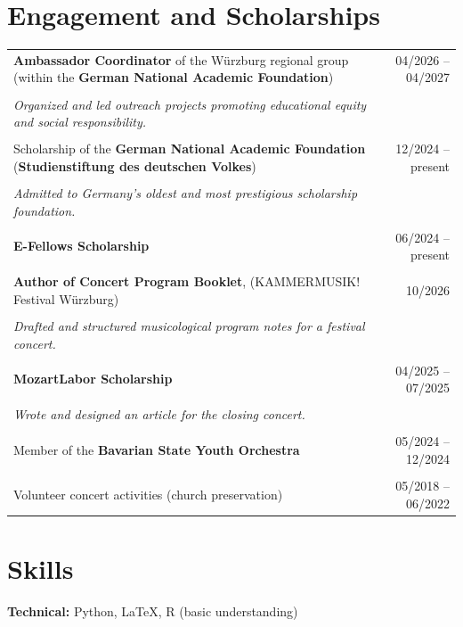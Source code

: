 \documentclass[11pt,a4paper]{article}
\begin{document}
\section{Engagement and Scholarships}

\begin{tabularx}{\textwidth}{X r}

\textbf{Ambassador Coordinator} of the Würzburg regional group (within the \textbf{German National Academic Foundation}) & 04/2026 -- 04/2027 \\\\
\textit{Organized and led outreach projects promoting educational equity and social responsibility.} \\\\
Scholarship of the \textbf{German National Academic Foundation} 
(\textbf{Studienstiftung des deutschen Volkes}) & 12/2024 -- present \\\\
\textit{Admitted to Germany's oldest and most prestigious scholarship foundation.} \\\\
\textbf{E-Fellows Scholarship} & 06/2024 -- present \\\\
\textbf{Author of Concert Program Booklet}, (KAMMERMUSIK! Festival Würzburg) & 10/2026 \\\\
\textit{Drafted and structured musicological program notes for a festival concert.}  & \\\\
\textbf{MozartLabor Scholarship} & 04/2025 -- 07/2025 \\\\
\textit{Wrote and designed an article for the closing concert.} \\\\
Member of the \textbf{Bavarian State Youth Orchestra} & 05/2024 -- 12/2024 \\\\
Volunteer concert activities (church preservation) & 05/2018 -- 06/2022
\end{tabularx}


\section{Skills}
\textbf{Technical:} Python, \LaTeX, R (basic understanding)
\end{document}
